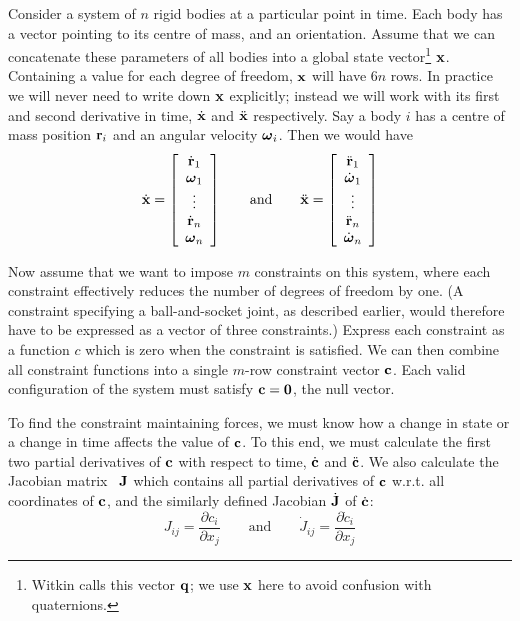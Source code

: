 Consider a system of $n$ rigid bodies at a particular point in time. Each body has a vector
pointing to its centre of mass, and an orientation. Assume that we can concatenate these
parameters of all bodies into a global state vector\footnote{Witkin calls this vector
$\ve{q}$; we use $\ve{x}$ here to avoid confusion with quaternions.} $\ve{x}$.
Containing a value for each degree of freedom, $\ve{x}$ will have $6n$ rows. In practice
we will never need to write down $\ve{x}$ explicitly; instead we will work with its
first and second derivative in time, $\dot{\ve{x}}$ and $\ddot{\ve{x}}$ respectively.
Say a body $i$ has a centre of mass position $\ve{r}_i$ and an angular velocity
$\ve{\omega}_i$. Then we would have
\begin{equation}
\label{lagrangeStateVector}
\dot{\ve{x}} = \left[ \begin{array}{c}
    \dot{\ve{r}}_1\\ \ve{\omega}_1\\ \vdots\\ \dot{\ve{r}}_n\\ \ve{\omega}_n \end{array}\right]
\quad\quad\mathrm{and}\quad\quad
\ddot{\ve{x}} = \left[ \begin{array}{c}
    \ddot{\ve{r}}_1\\ \dot{\ve{\omega}}_1\\ \vdots\\ \ddot{\ve{r}}_n\\ \dot{\ve{\omega}}_n
    \end{array}\right]
\end{equation}

Now assume that we want to impose $m$ constraints on this system, where each constraint
effectively reduces the number of degrees of freedom by one. (A constraint specifying a
ball-and-socket joint, as described earlier, would therefore have to be expressed as a
vector of three constraints.) Express each constraint as a function $c$ which is zero
when the constraint is satisfied. We can then combine all constraint functions into a
single $m$-row constraint vector $\ve{c}$. Each valid configuration of the system must
satisfy $\ve{c} = \ve{0}$, the null vector.

To find the constraint maintaining forces, we must know how a change in state or a change in
time affects the value of $\ve{c}$. To this end, we must calculate the first two partial
derivatives of $\ve{c}$ with respect to time, $\dot{\ve{c}}$ and $\ddot{\ve{c}}$.
We also calculate the Jacobian matrix~\cite{RHB:02} $\m{J}$ which contains all partial
derivatives of $\ve{c}$ w.r.t. all coordinates of $\ve{c}$, and the similarly
defined Jacobian $\dot{\m{J}}$ of $\dot{\ve{c}}$:
\begin{equation}
J_{ij} = \frac{\partial c_i}{\partial x_j} \quad\quad\mathrm{and}\quad\quad
\dot{J}_{ij} = \frac{\partial \dot{c}_i}{\partial x_j}
\end{equation}

